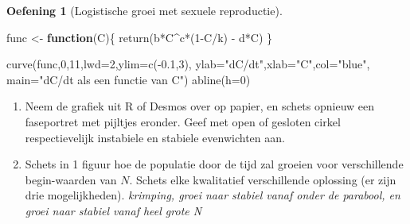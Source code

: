 \documentclass[
  a4paper,
]{scrbook}
\newenvironment{Shaded}{\begin{snugshade}}{\end{snugshade}}
\newcommand{\AttributeTok}[1]{\textcolor[rgb]{0.40,0.45,0.13}{#1}}
\newcommand{\ControlFlowTok}[1]{\textcolor[rgb]{0.00,0.23,0.31}{\textbf{#1}}}
\newcommand{\DecValTok}[1]{\textcolor[rgb]{0.68,0.00,0.00}{#1}}
\newcommand{\FloatTok}[1]{\textcolor[rgb]{0.68,0.00,0.00}{#1}}
\newcommand{\FunctionTok}[1]{\textcolor[rgb]{0.28,0.35,0.67}{#1}}
\newcommand{\NormalTok}[1]{\textcolor[rgb]{0.00,0.23,0.31}{#1}}
\newcommand{\OtherTok}[1]{\textcolor[rgb]{0.00,0.23,0.31}{#1}}
\newcommand{\SpecialCharTok}[1]{\textcolor[rgb]{0.37,0.37,0.37}{#1}}
\newcommand{\StringTok}[1]{\textcolor[rgb]{0.13,0.47,0.30}{#1}}
\providecommand{\tightlist}{%
  \setlength{\itemsep}{0pt}\setlength{\parskip}{0pt}}\usepackage{longtable,booktabs,array}
\theoremstyle{definition}
\newtheorem{exercise}{Oefening}[chapter]
\theoremstyle{remark}
\begin{document}
\begin{exercise}[Logistische groei met sexuele
reproductie]
\begin{Shaded}
\begin{Highlighting}[]
\NormalTok{func }\OtherTok{\textless{}{-}} \ControlFlowTok{function}\NormalTok{(C)\{}
 \FunctionTok{return}\NormalTok{(b}\SpecialCharTok{*}\NormalTok{C}\SpecialCharTok{\^{}}\NormalTok{c}\SpecialCharTok{*}\NormalTok{(}\DecValTok{1}\SpecialCharTok{{-}}\NormalTok{C}\SpecialCharTok{/}\NormalTok{k) }\SpecialCharTok{{-}}\NormalTok{ d}\SpecialCharTok{*}\NormalTok{C)}
\NormalTok{\}}

\FunctionTok{curve}\NormalTok{(func,}\DecValTok{0}\NormalTok{,}\DecValTok{11}\NormalTok{,}\AttributeTok{lwd=}\DecValTok{2}\NormalTok{,}\AttributeTok{ylim=}\FunctionTok{c}\NormalTok{(}\SpecialCharTok{{-}}\FloatTok{0.1}\NormalTok{,}\DecValTok{3}\NormalTok{),}
       \AttributeTok{ylab=}\StringTok{"dC/dt"}\NormalTok{,}\AttributeTok{xlab=}\StringTok{"C"}\NormalTok{,}\AttributeTok{col=}\StringTok{"blue"}\NormalTok{,}
       \AttributeTok{main=}\StringTok{"dC/dt als een functie van C"}\NormalTok{)}
\FunctionTok{abline}\NormalTok{(}\AttributeTok{h=}\DecValTok{0}\NormalTok{)}
\end{Highlighting}
\end{Shaded}

\begin{enumerate}
\def\labelenumi{\alph{enumi}.}
\setcounter{enumi}{1}
\tightlist
\item
  Neem de grafiek uit R of Desmos over op papier, en schets opnieuw een
  faseportret met pijltjes eronder. Geef met open of gesloten cirkel
  respectievelijk instabiele en stabiele evenwichten aan.
\item
  Schets in 1 figuur hoe de populatie door de tijd zal groeien voor
  verschillende begin-waarden van \(N\). Schets elke kwalitatief
  verschillende oplossing (er zijn drie mogelijkheden). \emph{krimping,
  groei naar stabiel vanaf onder de parabool, en groei naar stabiel
  vanaf heel grote N}
\end{enumerate}

\end{exercise}
\end{document}

